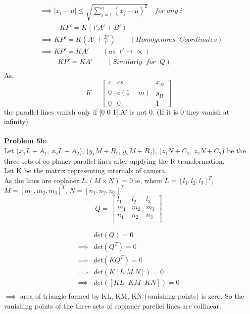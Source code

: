 \documentclass[a4paper]{article}
\begin{document}
\begin{equation*}
\begin{split}
&\implies |x_i- \mu| \leq \sqrt{\sum_{j=1}^{n} (x_j-\mu)^2 } \quad for\; any\; i\\
& \;\;\;\qquad KP' = K(t'A'+B')\\
&\implies KP' = K(A'+\frac{B'}{t'}) \qquad (Homogenous\;\; Coordinates)\\ 
&\implies KP' = KA' \qquad (as \;\;t'\rightarrow\varpropto)\\
&\qquad \;\; KP' = KA' \qquad (Similarly\;\; for\;\; Q)\\
\end{split}
\end{equation*}
As, 
\[
K=
\begin{bmatrix}
    c       & cs & x_{H}  \\
    0       & c(1+m) & y_{H}  \\
    0       & 0 & 1
\end{bmatrix}
\]
the parallel lines vanish only if [0 0 1].A$'$ is not 0. (If it is 0 they vanish at infinity)\\ \\
\textbf{Problem 5b:}\\
Let ($x_1L+A_1$, $x_2L+A_2$), ($y_1M+B_1$, $y_2M+B_2$), ($z_1N+C_1$, $z_2N+C_2$) be the three sets of co-planer parallel lines after applying the R transformation.\\
Let K be the matrix representing internals of camera.\\
As the lines are coplaner $L.(M \times N) = 0 $  ie, where $L = [l_1,l_2,l_3]^T$, $M = [m_1,m_2,m_3]^T$, $N = [n_1,n_2,n_3]^T$
\[
Q=
\begin{bmatrix}
    l_1       & l_2 & l_3  \\
    m_1       & m_2 & m_3  \\
    n_1       & n_2 & n_3  \\
\end{bmatrix}
\]

\begin{equation*} 
\begin{split}
& det(Q) = 0 \\
\implies & det(Q^T)=0 \\
\implies & det(KQ^T)=0\\
\implies & det(K[L\; M\; N]) =0 \\
\implies & det([KL\;\; KM\;\; KN]) = 0\\
\end{split}
\end{equation*}
$\implies$ area of triangle formed by KL, KM, KN (vanishing points) is zero. So the vanishing points of the three sets of coplaner parellel lines are collinear. 
\end{document}
